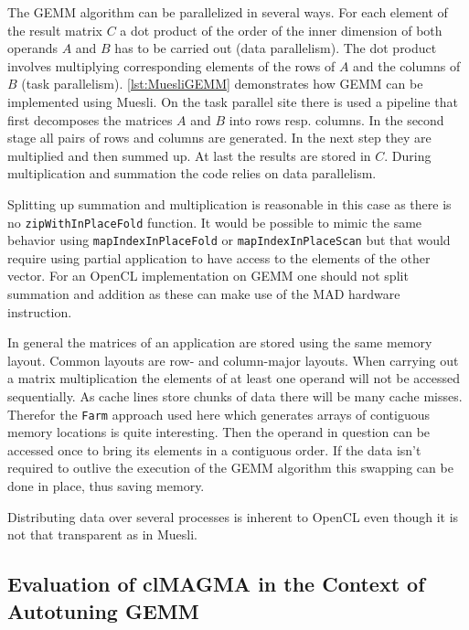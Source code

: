 The \ac{GEMM} algorithm can be parallelized in several ways. For each element 
of the result matrix $C$ a dot product of the order of the 
inner dimension of both operands $A$ and $B$ has to be carried out (data 
parallelism). The dot product involves multiplying corresponding elements of 
the rows of $A$ and the columns of $B$ (task parallelism). 
\cref{lst:MuesliGEMM} demonstrates how \ac{GEMM} can be implemented using 
\ac{Muesli}. On the task parallel site there is used a pipeline that first 
decomposes the matrices $A$ and $B$ into rows resp. columns. In the second stage 
all pairs of rows and columns are generated. In the next step they are 
multiplied and then summed up. At last the results are stored in $C$. During 
multiplication and summation the code relies on data parallelism.

Splitting up summation and multiplication is reasonable in this case as there 
is no \texttt{zipWithInPlaceFold} function. It would be possible to mimic the 
same behavior using \texttt{mapIndexInPlaceFold} or 
\texttt{mapIndexInPlaceScan} but that would require using partial application 
to have access to the elements of the other vector. For an OpenCL 
implementation on \ac{GEMM} one should not split summation and addition as 
these can make use of the MAD hardware instruction.

In general the matrices of an application are stored using the same memory 
layout. Common layouts are row- and column-major layouts. When carrying out a 
matrix multiplication the elements of at least one operand will not be accessed 
sequentially. As cache lines store chunks of data there will be many cache 
misses. Therefor the \texttt{Farm} approach used here which generates arrays of 
contiguous memory locations is quite interesting. Then the operand in question 
can be accessed once to bring its elements in a contiguous order. If the data 
isn't required to outlive the execution of the \ac{GEMM} algorithm this 
swapping can be done in place, thus saving memory.

Distributing data over several processes is inherent to OpenCL even though it 
is not that transparent as in \ac{Muesli}.



\subsection{Evaluation of clMAGMA in the Context of Autotuning \acs{GEMM}}

